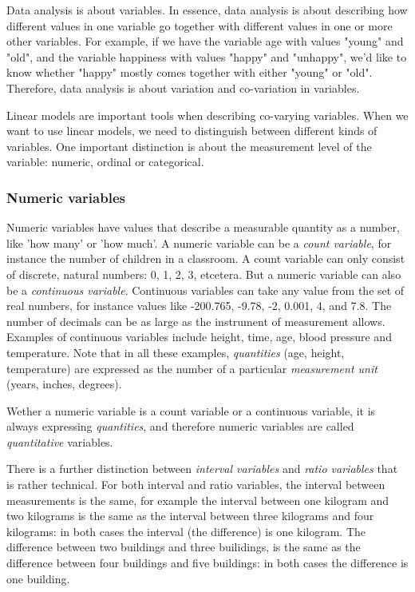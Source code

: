Data analysis is about variables. In essence, data analysis is about describing how different values in one variable go together with different values in one or more other variables. For example, if we have the variable age with values "young" and "old", and the variable happiness with values "happy" and "unhappy", we'd like to know whether "happy" mostly comes together with either "young" or "old". Therefore, data analysis is about variation and co-variation in variables.

Linear models are important tools when describing co-varying variables. When we want to use linear models, we need to distinguish between different kinds of variables. One important distinction is about the measurement level of the variable: numeric, ordinal or categorical.


\subsubsection{Numeric variables}

Numeric variables have values that describe a measurable quantity as a number, like 'how many' or 'how much'. A numeric variable can be a \textit{count variable}, for instance the number of children in a classroom. A count variable can only consist of discrete, natural numbers: 0, 1, 2, 3, etcetera. But a numeric variable can also be a \textit{continuous variable}. Continuous variables can take any value from the set of real numbers, for instance values like -200.765, -9.78, -2, 0.001, 4, and 7.8. The number of decimals can be as large as the instrument of measurement allows. Examples of continuous variables include height, time, age, blood pressure and temperature. Note that in all these examples, \textit{quantities} (age, height, temperature) are expressed as the number of a particular \textit{measurement unit} (years, inches, degrees).

Wether a numeric variable is a count variable or a continuous variable, it is always expressing \textit{quantities}, and therefore numeric variables are called \textit{quantitative} variables.

There is a further distinction between \textit{interval variables} and \textit{ratio variables} that is rather technical. For both interval and ratio variables, the interval between measurements is the same, for example the interval between one kilogram and two kilograms is the same as the interval between three kilograms and four kilograms: in both cases the interval (the difference) is one kilogram. The difference between two buildings and three builidings, is the same as the difference between four buildings and five buildings: in both cases the difference is one building.

